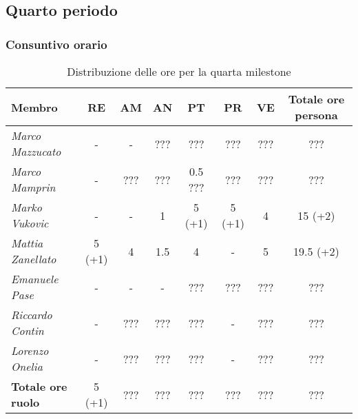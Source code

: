 \subsection{Quarto periodo}

\subsubsection{Consuntivo orario}
\begin{table}[H]
    \centering
    \begin{tabular}{|l|c|c|c|c|c|c|c|}
    \hline
    \textbf{Membro} & \multicolumn{1}{c|}{\textbf{RE}} & \multicolumn{1}{c|}{\textbf{AM}} & \multicolumn{1}{c|}{\textbf{AN}} & \multicolumn{1}{c|}{\textbf{PT}} & \multicolumn{1}{c|}{\textbf{PR}} & \multicolumn{1}{c|}{\textbf{VE}} & \multicolumn{1}{c|}{\textbf{Totale ore persona}} \\ \hline
    \textit{Marco Mazzucato}  & -       & -           & ???         & ???         & ???     & ???          & ???       \\ \hline
    \textit{Marco Mamprin}    & -       & ???         & ???         & 0.5 ???     & ???     & ???          & ???         \\ \hline
    \textit{Marko Vukovic}    & -       & -           & 1           & 5 (+1)      & 5 (+1)  & 4            & 15 (+2)        \\ \hline
    \textit{Mattia Zanellato} & 5 (+1)  & 4           & 1.5         & 4           & -       & 5            & 19.5 (+2)       \\ \hline
    \textit{Emanuele Pase}    & -       & -           & -           & ???         & ???     & ???          & ???     \\ \hline
    \textit{Riccardo Contin}  & -       & ???         & ???         & ???         & -       & ???          & ???           \\ \hline
    \textit{Lorenzo Onelia}   & -       & ???         & ???         & ???         & -       & ???          & ???       \\ \hline
    \textbf{Totale ore ruolo} & 5 (+1)  & ???         & ???         & ???         & ???     & ???          & ???     \\ \hline
    \end{tabular}
  \caption{Distribuzione delle ore per la quarta milestone}
\end{table}

